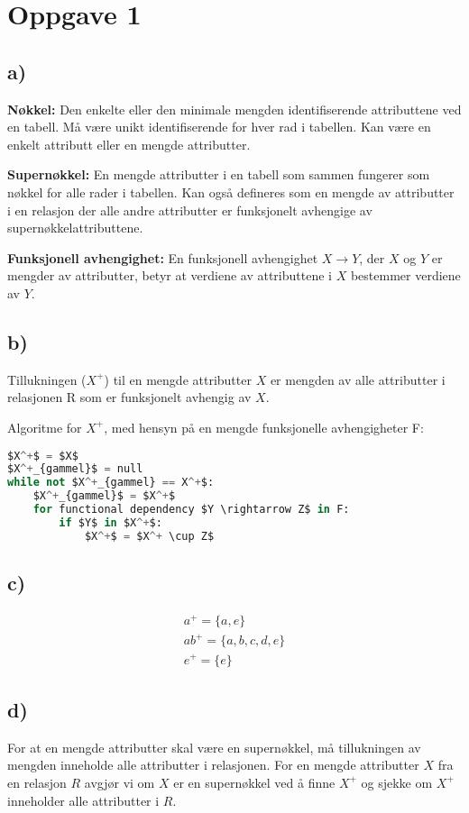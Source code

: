 \documentclass[a4paper, 12pt] {article}
\begin{document}

\newpage

\tableofcontents
\newpage


\section{Oppgave 1}

\subsection{a)}

\textbf{Nøkkel:} Den enkelte eller den minimale mengden identifiserende attributtene ved en tabell. Må være unikt identifiserende for hver rad i tabellen. Kan være en enkelt attributt eller en mengde attributter.


\textbf{Supernøkkel:} En mengde attributter i en tabell som sammen fungerer som nøkkel for alle rader i tabellen. Kan også defineres som en mengde av attributter i en relasjon der alle andre attributter er funksjonelt avhengige av supernøkkelattributtene.


\textbf{Funksjonell avhengighet:} En funksjonell avhengighet $X \rightarrow Y$, der $X$ og $Y$ er mengder av attributter, betyr at verdiene av attributtene i $X$ bestemmer verdiene av $Y$.

\subsection{b)}

Tillukningen ($X^+$) til en mengde attributter $X$ er mengden av alle attributter i relasjonen R som er funksjonelt avhengig av $X$.

Algoritme for $X^+$, med hensyn på en mengde funksjonelle avhengigheter F:

\begin{lstlisting}[language=Python, caption=Tillukningsalgoritme, mathescape]
$X^+$ = $X$
$X^+_{gammel}$ = null
while not $X^+_{gammel} == X^+$:
    $X^+_{gammel}$ = $X^+$
    for functional dependency $Y \rightarrow Z$ in F:
        if $Y$ in $X^+$:
            $X^+$ = $X^+ \cup Z$
\end{lstlisting}

\subsection{c)}

\begin{gather*}
a^+ = \{a, e\} \\
ab^+ = \{a, b, c, d, e\} \\
e^+ = \{e\}
\end{gather*}

\subsection{d)}

For at en mengde attributter skal være en supernøkkel, må tillukningen av mengden inneholde alle attributter i relasjonen. For en mengde attributter $X$ fra en relasjon $R$ avgjør vi om $X$ er en supernøkkel ved å finne $X^+$ og sjekke om $X^+$ inneholder alle attributter i $R$.
\end{document}
